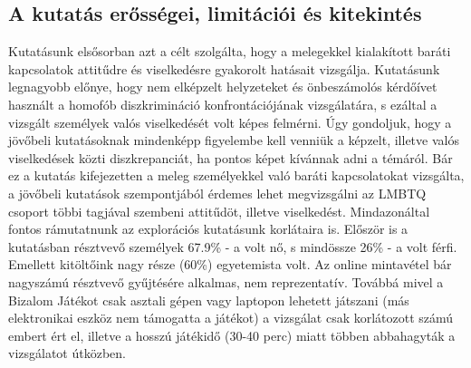 \subsection{A kutatás erősségei, limitációi és kitekintés}
Kutatásunk elsősorban azt a célt szolgálta, hogy a melegekkel kialakított baráti kapcsolatok attitűdre és viselkedésre gyakorolt hatásait vizsgálja.
Kutatásunk legnagyobb előnye, hogy nem elképzelt helyzeteket és önbeszámolós kérdőívet használt a homofób diszkrimináció konfrontációjának vizsgálatára, s ezáltal a vizsgált személyek valós viselkedését volt képes felmérni. Úgy gondoljuk, hogy a jövőbeli kutatásoknak mindenképp figyelembe kell venniük a képzelt, illetve valós viselkedések közti diszkrepanciát, ha pontos képet kívánnak adni a témáról. Bár ez a kutatás kifejezetten a meleg személyekkel való baráti kapcsolatokat vizsgálta, a jövőbeli kutatások szempontjából érdemes lehet megvizsgálni az LMBTQ csoport többi tagjával szembeni attitűdöt, illetve viselkedést.
Mindazonáltal fontos rámutatnunk az explorációs kutatásunk korlátaira is. Először is a kutatásban résztvevő személyek 67.9\% - a volt nő, s mindössze 26\% - a volt férfi. Emellett kitöltőink nagy része (60\%) egyetemista volt.  Az online mintavétel bár nagyszámú résztvevő gyűjtésére alkalmas, nem reprezentatív. Továbbá mivel a Bizalom Játékot csak asztali gépen vagy laptopon lehetett játszani (más elektronikai eszköz nem támogatta a játékot) a vizsgálat csak korlátozott számú embert ért el, illetve a hosszú játékidő (30-40 perc) miatt többen abbahagyták a vizsgálatot útközben. 

\pagebreak



